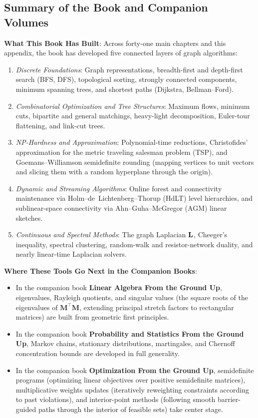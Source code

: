 \subsection{Summary of the Book and Companion Volumes}
\begin{connectionbox}
\textbf{What This Book Has Built}:
Across forty-one main chapters and this appendix, the book has developed five connected layers of graph algorithms:
\begin{enumerate}
  \item \emph{Discrete Foundations}: Graph representations, breadth-first and depth-first search (BFS, DFS), topological sorting, strongly connected components, minimum spanning trees, and shortest paths (Dijkstra, Bellman--Ford).
  \item \emph{Combinatorial Optimization and Tree Structures}: Maximum flows, minimum cuts, bipartite and general matchings, heavy-light decomposition, Euler-tour flattening, and link-cut trees.
  \item \emph{NP-Hardness and Approximation}: Polynomial-time reductions, Christofides' approximation for the metric traveling salesman problem (TSP), and Goemans--Williamson semidefinite rounding (mapping vertices to unit vectors and slicing them with a random hyperplane through the origin).
  \item \emph{Dynamic and Streaming Algorithms}: Online forest and connectivity maintenance via Holm--de~Lichtenberg--Thorup (HdLT) level hierarchies, and sublinear-space connectivity via Ahn--Guha--McGregor (AGM) linear sketches.
  \item \emph{Continuous and Spectral Methods}: The graph Laplacian $\mathbf{L}$, Cheeger's inequality, spectral clustering, random-walk and resistor-network duality, and nearly linear-time Laplacian solvers.
\end{enumerate}

\textbf{Where These Tools Go Next in the Companion Books}:
\begin{itemize}
  \item In the companion book \textbf{Linear Algebra From the Ground Up}, eigenvalues, Rayleigh quotients, and singular values (the square roots of the eigenvalues of $\mathbf{M}^\top\mathbf{M}$, extending principal stretch factors to rectangular matrices) are built from geometric first principles.
  \item In the companion book \textbf{Probability and Statistics From the Ground Up}, Markov chains, stationary distributions, martingales, and Chernoff concentration bounds are developed in full generality.
  \item In the companion book \textbf{Optimization From the Ground Up}, semidefinite programs (optimizing linear objectives over positive semidefinite matrices), multiplicative weights updates (iteratively reweighting constraints according to past violations), and interior-point methods (following smooth barrier-guided paths through the interior of feasible sets) take center stage.
\end{itemize}
\end{connectionbox}

